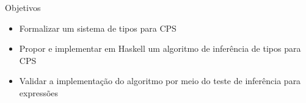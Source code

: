 \begin{frame}{Objetivos}
    \begin{itemize}
        \item Formalizar um sistema de tipos para CPS
        \item Propor e implementar em Haskell um algoritmo de inferência de tipos para CPS
        \item Validar a implementação do algoritmo por meio do teste de inferência para expressões
    \end{itemize}
\end{frame}